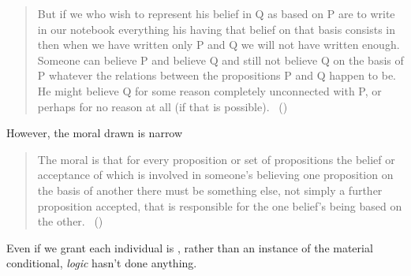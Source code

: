 \begin{note}
  \begin{quote}
    But if we who wish to represent his belief in Q as based on P are to write in our notebook everything his having that belief on that basis consists in then when we have written only P and Q we will not have written enough.
    Someone can believe P and believe Q and still not believe Q on the basis of P whatever the relations between the propositions P and Q happen to be.
    He might believe Q for some reason completely unconnected with P, or perhaps for no reason at all (if that is possible).%
    \mbox{ }\hfill\mbox{(\citeyear[185]{Stroud:1979aa})}
  \end{quote}
  However, the moral drawn is narrow
  \begin{quote}
    The moral is that for every proposition or set of propositions the belief or acceptance of which is involved in someone's believing one proposition on the basis of another there must be something else, not simply a further proposition accepted, that is responsible for the one belief's being based on the other.%
    \mbox{ }\hfill\mbox{(\citeyear[187]{Stroud:1979aa})}
  \end{quote}

  Even if we grant each individual is \ros{}, rather than an instance of the material conditional, \emph{logic} hasn't done anything.
\end{note}


